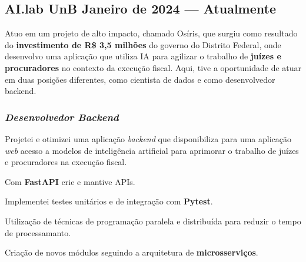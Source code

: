\documentclass[a4paper,12pt]{article}
\begin{document}



\subsection*{\large AI.lab UnB \hfill Janeiro de 2024 --- Atualmente}


Atuo em um projeto de alto impacto, chamado Osíris, que surgiu como resultado do \textbf{investimento de R\$ 3,5
milhões} do governo do Distrito Federal, onde desenvolvo uma aplicação que utiliza IA
para agilizar o trabalho de \textbf{juízes e procuradores} no contexto da execução fiscal. Aqui, tive a oportunidade
de atuar em duas posições diferentes, como cientista de dados e como desenvolvedor backend.

\vspace{0.5em}

\vspace{1em}

\subsubsection*{\small \textit{Desenvolvedor Backend} }
\vspace{-1em}
\vspace{-0.5em}
\begin{zitemize}
    \item Projetei e otimizei uma aplicação \textit{backend} que disponibiliza para uma aplicação \textit{web} acesso a modelos de inteligência artificial para aprimorar o trabalho de juízes e procuradores na execução fiscal.
    \item Com \textbf{FastAPI} crie e mantive APIs.
    \item Implementei testes unitários e de integração com \textbf{Pytest}.
    \item Utilização de técnicas de programação paralela e distribuída para reduzir o tempo de processamanto.
    \item Criação de novos módulos seguindo a arquitetura de \textbf{microsserviços}.
\end{zitemize}
\end{document}

